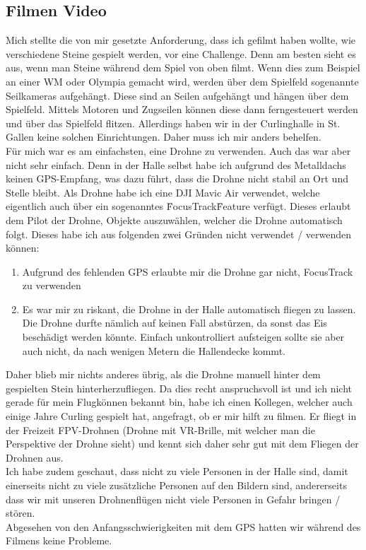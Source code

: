 \documentclass[11pt]{article}
\begin{document}
    \subsection{Filmen Video}
    Mich stellte die von mir gesetzte Anforderung, dass ich gefilmt haben wollte, wie verschiedene Steine gespielt werden, vor eine Challenge.
    Denn am besten sieht es aus, wenn man Steine während dem Spiel von oben filmt. Wenn dies zum Beispiel an einer WM oder Olympia gemacht wird,
    werden über dem Spielfeld sogenannte Seilkameras aufgehängt. Diese sind an Seilen aufgehängt und hängen über dem Spielfeld. Mittels Motoren
    und Zugseilen können diese dann ferngesteuert werden und über das Spielfeld flitzen. Allerdings haben wir in der Curlinghalle in St. Gallen
    keine solchen Einrichtungen. Daher muss ich mir anders behelfen.\\
    Für mich war es am einfachsten, eine Drohne zu verwenden. Auch das war aber nicht sehr einfach. Denn in der Halle selbst habe ich aufgrund
    des Metalldachs keinen GPS-Empfang, was dazu führt, dass die Drohne nicht stabil an Ort und Stelle bleibt.
    Als Drohne habe ich eine DJI Mavic Air verwendet, welche eigentlich auch über ein sogenanntes \"FocusTrack\" Feature verfügt. Dieses erlaubt dem
    Pilot der Drohne, Objekte auszuwählen, welcher die Drohne automatisch folgt. Dieses habe ich aus folgenden zwei Gründen nicht verwendet
    / verwenden können:

    \begin{enumerate}
        \item Aufgrund des fehlenden GPS erlaubte mir die Drohne gar nicht, FocusTrack zu verwenden
        \item Es war mir zu riskant, die Drohne in der Halle automatisch fliegen zu lassen. Die Drohne durfte nämlich auf keinen Fall abstürzen,
        da sonst das Eis beschädigt werden könnte. Einfach unkontrolliert aufsteigen sollte sie aber auch nicht, da nach wenigen Metern
        die Hallendecke kommt.
    \end{enumerate}
    Daher blieb mir nichts anderes übrig, als die Drohne manuell hinter dem gespielten Stein hinterherzufliegen. Da dies recht anspruchsvoll ist
    und ich nicht gerade für mein Flugkönnen bekannt bin, habe ich einen Kollegen, welcher auch einige Jahre Curling gespielt hat, angefragt, ob er
    mir hilft zu filmen. Er fliegt in der Freizeit FPV-Drohnen (Drohne mit VR-Brille, mit welcher man die Perspektive der Drohne sieht) und kennt
    sich daher sehr gut mit dem Fliegen der Drohnen aus.\\
    Ich habe zudem geschaut, dass nicht zu viele Personen in der Halle sind, damit einerseits nicht zu viele zusätzliche Personen auf den Bildern
    sind, andererseits dass wir mit unseren Drohnenflügen nicht viele Personen in Gefahr bringen / stören.\\
    Abgesehen von den Anfangsschwierigkeiten mit dem GPS hatten wir während des Filmens keine Probleme.
\end{document}
